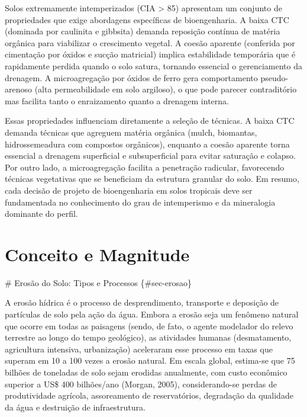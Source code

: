 \documentclass[
  portuguese,
  11pt,
  a4paper,
  open=any]{scrbook}
\begin{document}
\begin{tcolorbox}[enhanced jigsaw, leftrule=.75mm, colframe=quarto-callout-warning-color-frame, colback=white, bottomrule=.15mm, opacityback=0, colbacktitle=quarto-callout-warning-color!10!white, breakable, bottomtitle=1mm, opacitybacktitle=0.6, title=\textcolor{quarto-callout-warning-color}{\faExclamationTriangle}\hspace{0.5em}{Atenção}, titlerule=0mm, toprule=.15mm, toptitle=1mm, rightrule=.15mm, left=2mm, arc=.35mm, coltitle=black]

Solos extremamente intemperizados (CIA \textgreater{} 85) apresentam um
conjunto de propriedades que exige abordagens específicas de
bioengenharia. A baixa CTC (dominada por caulinita e gibbsita) demanda
reposição contínua de matéria orgânica para viabilizar o crescimento
vegetal. A coesão aparente (conferida por cimentação por óxidos e sucção
matricial) implica estabilidade temporária que é rapidamente perdida
quando o solo satura, tornando essencial o gerenciamento da drenagem. A
microagregação por óxidos de ferro gera comportamento pseudo-arenoso
(alta permeabilidade em solo argiloso), o que pode parecer contraditório
mas facilita tanto o enraizamento quanto a drenagem interna.

\end{tcolorbox}

Essas propriedades influenciam diretamente a seleção de técnicas. A
baixa CTC demanda técnicas que agreguem matéria orgânica (mulch,
biomantas, hidrossemeadura com compostos orgânicos), enquanto a coesão
aparente torna essencial a drenagem superficial e subsuperficial para
evitar saturação e colapso. Por outro lado, a microagregação facilita a
penetração radicular, favorecendo técnicas vegetativas que se beneficiam
da estrutura granular do solo. Em resumo, cada decisão de projeto de
bioengenharia em solos tropicais deve ser fundamentada no conhecimento
do grau de intemperismo e da mineralogia dominante do perfil.

\chapter{Conceito e Magnitude}\label{conceito-e-magnitude}

\# Erosão do Solo: Tipos e Processos \{\#sec-erosao\}

A erosão hídrica é o processo de desprendimento, transporte e deposição
de partículas de solo pela ação da água. Embora a erosão seja um
fenômeno natural que ocorre em todas as paisagens (sendo, de fato, o
agente modelador do relevo terrestre ao longo do tempo geológico), as
atividades humanas (desmatamento, agricultura intensiva, urbanização)
aceleraram esse processo em taxas que superam em 10 a 100 vezes a erosão
natural. Em escala global, estima-se que 75 bilhões de toneladas de solo
sejam erodidas anualmente, com custo econômico superior a US\$ 400
bilhões/ano (Morgan, 2005), considerando-se perdas de produtividade
agrícola, assoreamento de reservatórios, degradação da qualidade da água
e destruição de infraestrutura.
\end{document}
